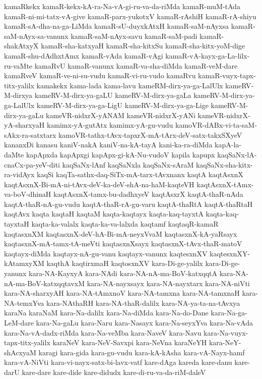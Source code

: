 {kamaRkekx
kamaR-kekx-kA-ra-Na-vA-gi-ru-va-da-riMda
kamaR-muM-tAda
kamaR-ni-mi-tatx-vA-give
kamaR-parx-yukotxV
kamaR-rAshiH
kamaR-rA-shiyu
kamaR-sA-dha-na-ga-LiMda
kamaR-sU-duyxkAtxH
kamaR-saM-nAyxsa
kamaR-saM-nAyx-sa-vanunx
kamaR-saM-nAyx-savu
kamaR-saM-padi
kamaR-shakAtxyX
kamaR-sha-katxyaH
kamaR-sha-kitxSu
kamaR-sha-kitx-yoM-dige
kamaR-shu-dAdhxtAmx
kamaR-vAda
kamaR-vAgi
kamaR-vA-kayx-ga-La-lilx-ru-vaMte
kamaRvU
kamaR-vanunx
kamaR-va-sha-diMda
kamaR-veM-dare
kamaRveV
kamaR-ve-ni-su-vudu
kamaR-vi-ru-vudo
kamaRvu
kamaR-vuyx-tapx-titx-yalilx
kamakekx
kama-lada
kama-lavu
kameRM-dirx-ya-ga-LalUlx
kameRV-M-dirxya
kameRV-M-dirx-ya-gaLU
kameRV-M-dirx-ya-gaLa
kameRV-M-dirx-ya-ga-LalUlx
kameRV-M-dirx-ya-ga-LigU
kameRV-M-dirx-ya-ga-Lige
kameRV-M-dirx-ya-gaLu
kameVR-nidxrX-yANAM
kameVR-nidxrX-yANi
kameVR-nidxrX-yA-sharxyaH
kamimx-yA-gutAtx
kamimx-yA-gu-vudu
kamoVR-dABx-vi-ta-saM-sAkx-ra-satxtarx
kamoVR-tathx-tAvx-tapxrX-mA-tArx-deV-satx-takxSXyeV
kananxDi
kanasu
kaniV-nakA
kaniV-na-kA-tayA
kani-ka-ra-diMda
kapA-la-daMte
kapApxda
kapApxgi
kapApx-gi-kA-Nu-vudoV
kapila
kapupx
kaqSaNx-lA-cnaCx-pa-yeV-diti
kaqSaNx-lAnf
kaqSaNxla
kaqSaNx-sAraM
kaqSaNx-sha-kitx-ra-vidAyx
kaqSi
kaqTa-sathx-daq-SiTx-mA-tarx-tAvxnanx
kaqtA
kaqtAsxnX
kaqtAsxnX-Bi-mA-ni-tAvx-deV-ka-deV-shA-na-haM-kaqteVH
kaqtAsxnX-tAmx-va-boV-dhinaH
kaqtAsxnX-tamx-bu-dadhxyeV
kaqtAsxrX
kaqtA-thaR-nAda
kaqtA-thaR-nA-gu-vudu
kaqtA-thaR-rA-gu-varu
kaqtA-thaRtA
kaqtA-thaRtaH
kaqtAvx
kaqta
kaqtaH
kaqtaM
kaqta-kaqtayx
kaqta-kaq-tayxtA
kaqta-kaq-tayxtaH
kaqta-ka-valalx
kaqta-ka-va-lalxda
kaqtamf
kaqtaqR-kamaR
kaqtasxnXM
kaqtasxnX-deV-hA-Bi-mA-neyxVvaM
kaqtasxnX-kA-yaRsayx
kaqtasxnX-mA-tamx-tA-meVti
kaqtasxnXsayx
kaqtasxnX-tAvx-thaR-matoV
kaqtayx-diMda
kaqtayx-nA-gu-vanu
kaqtayx-vanunx
kaqtesxnXV
kaqtesxnXY-kAtamxyXM
kaqthA
kaqtirxmaH
kaqtosxnXV
kara-Di-ge-yalilx
kara-Di-ge-yanunx
kara-NA-KayxyA
kara-NAdi
kara-NA-nA-ma-BoV-katxqqtA
kara-NA-nA-ma-BoV-katxqqtavxM
kara-NA-nayxsayx
kara-NA-nayxtarx
kara-NA-niVti
kara-NA-sharxyAH
kara-NA-tAmxnoV
kara-NA-tamxna
kara-NA-tamxnaH
kara-NA-temxYva
kara-NAthaRH
kara-NA-thaR-dalilx
kara-NA-ya-ta-na-tAvxya
karaNa
karaNaM
kara-Na-dalilx
kara-Na-diMda
kara-Na-do-Dane
kara-Na-ga-LeM-dare
kara-Na-gaLu
kara-Naru
kara-Nasayx
kara-Na-seyxYva
kara-Na-vAda
kara-Na-vA-dadx-riMda
kara-Na-veMba
kara-NaveV
kara-Navu
kara-Na-vuyx-tapx-titx-yalilx
karaNeV
kara-NeV-Savxpi
kara-NeVna
karaNeYH
kara-NeY-shAcxyaM
karagi
kara-gida
kara-gu-vudu
kara-kA-kAsha
kara-vA-Nayx-hamf
kara-vA-NiVti
kara-vi-nayx-satx-bi-lavx-vatf
kare-dAga
kareda
kare-danu
kare-darU
kare-dare
kare-dide
kare-didudx
kare-di-ru-va-da-riM-daleV
}
